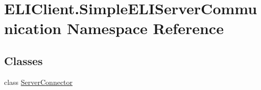 \hypertarget{namespace_e_l_i_client_1_1_simple_e_l_i_server_communication}{}\section{E\+L\+I\+Client.\+Simple\+E\+L\+I\+Server\+Communication Namespace Reference}
\label{namespace_e_l_i_client_1_1_simple_e_l_i_server_communication}
\subsection*{Classes}
\begin{DoxyCompactItemize}
\item 
class \hyperlink{class_e_l_i_client_1_1_simple_e_l_i_server_communication_1_1_server_connector}{Server\+Connector}
\end{DoxyCompactItemize}
